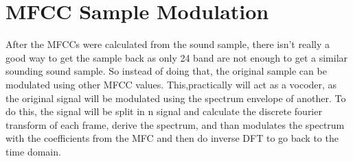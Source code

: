 \section{MFCC Sample Modulation}

After the MFCCs were calculated from the sound sample, there isn't really a good way to get the sample back as only 24 band are not enough to get a similar sounding sound sample.
So instead of doing that, the original sample can be modulated using other MFCC values. This,practically will act as a vocoder, as the original signal will be modulated using the spectrum envelope of another.
To do this, the signal will be split in n signal and calculate the discrete fourier transform of each frame, derive the spectrum, and than modulates the spectrum with the coefficients from the MFC and then do inverse DFT to go back to the time domain.